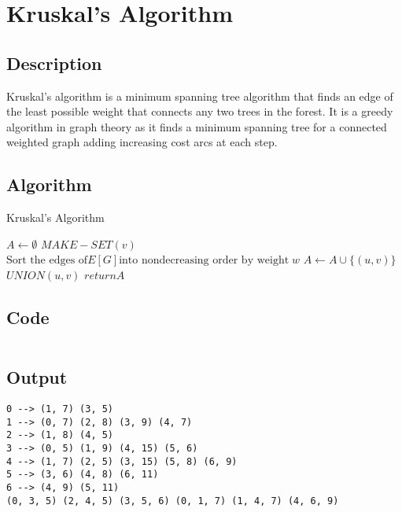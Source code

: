 \section{Kruskal's Algorithm}

\subsection{Description}
Kruskal's algorithm is a minimum spanning tree algorithm that finds an edge of the least possible weight that connects any two trees in the forest. It is a greedy algorithm in graph theory as it finds a minimum spanning tree for a connected weighted graph adding increasing cost arcs at each step.

\subsection{Algorithm}


\begin{algorithm}[H]
    \caption{Kruskal's Algorithm}
    \begin{algorithmic}[1]
        \State $A \gets \emptyset$
        \State $MAKE-SET(v)$
        \EndFor
        \State $\text{Sort the edges of} E[G] \text{into nondecreasing order by weight}\; w$
        \State $A \gets A \cup \{(u, v)\}$
        \State $UNION(u, v)$
        \EndIf
        \EndFor
        \State $return A$
        \EndProcedure
    \end{algorithmic}
\end{algorithm}

\subsection{Code}

\inputminted[fontsize=\footnotesize,bgcolor=bg,linenos,autogobble,frame=single,framerule=0.01pt,rulecolor=FSBorder,stripall,breaklines]{c++}{code/kruskal.cpp}

\subsection{Output}

\begin{lstlisting}[style=output]
0 --> (1, 7) (3, 5)
1 --> (0, 7) (2, 8) (3, 9) (4, 7)
2 --> (1, 8) (4, 5)
3 --> (0, 5) (1, 9) (4, 15) (5, 6)
4 --> (1, 7) (2, 5) (3, 15) (5, 8) (6, 9)
5 --> (3, 6) (4, 8) (6, 11)
6 --> (4, 9) (5, 11)
(0, 3, 5) (2, 4, 5) (3, 5, 6) (0, 1, 7) (1, 4, 7) (4, 6, 9)
\end{lstlisting}